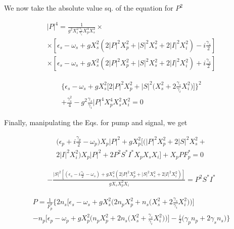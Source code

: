 \documentclass[a4paper,prb,10pt,aps,twocolumn]{revtex4-1}
\begin{document}
We now take the absolute value sq. of the equation for $P^{2}$

\begin{multline}
  \label{eq:28}
|P|^{4}=\frac{1}{g^{2}X_{i}^{2}\frac{\gamma_{s}}{\gamma_{i}}X_{p}^{4}X_{s}^{2}}\times\\
\times \left[\epsilon_{s}-\omega_{s}+gX_{s}^{2}\left(2|P|^{2}X_{p}^{2}+|S|^{2}X_{s}^{2}+2|I|^{2}X_{i}^{2}\right)-i\frac{\gamma_{s}}{2}\right]\\
\times \left[\epsilon_{s}-\omega_{s}+gX_{s}^{2}\left(2|P|^{2}X_{p}^{2}+|S|^{2}X_{s}^{2}+2|I|^{2}X_{i}^{2}\right)+i\frac{\gamma_{s}}{2}\right]
\end{multline}

\begin{multline}
  \label{eq:29}
  \Bigg\{ \epsilon_{s}-\omega_{s}+gX_{s}^{2}\Bigg[2|P|^{2}X_{p}^{2}+|S|^{2}\Bigg(X_{s}^{2}+2\frac{\gamma_{s}}{\gamma_{i}}X_{i}^{2}\Bigg)\Bigg]\Bigg\}^{2}\\
+\frac{\gamma_{s}^{2}}{4}-g^{2}\frac{\gamma_{s}}{\gamma_{i}}|P|^{4}X_{p}^{4}X_{s}^{2}X_{i}^{2}=0
\end{multline}



Finally, manipulating the Eqs. for pump and signal, we get

\begin{multline}
  \label{eq:30}
\Bigg(\epsilon_{p}+i\frac{\gamma_{p}}{2}-\omega_{p}\Bigg)X_{p}|P|^{2}+gX_{p}^{2}\Bigg[\Bigg(|P|^{2}X_{p}^{2}+2|S|^{2}X_{s}^{2}+\\
 2|I|^{2}X_{i}^{2}\Bigg)X_{p}|P|^{2}+2P^{2}S^{*}I^{*}X_{p}X_{s}X_{i}\Bigg]+X_{p}PF_{p}^{*}=0  
\end{multline}

\tiny
\begin{multline}
  \label{eq:31}
-\frac{|S|^{2}\left[\left(\epsilon_{s}-i\frac{\gamma_{s}}{2}-\omega_{s}\right)+gX_{s}^{2}\left(2|P|^{2}X_{p}^{2}+|S|^{2}X_{s}^{2}+2|I|^{2}X_{i}^{2}\right)\right]}{gX_{s}X_{p}^{2}X_{i}}=P^{2}S^{*}I^{*}  
\end{multline}
\normalsize

\begin{multline}
  \label{eq:33}
P=\frac{1}{F_{p}^{*}}\Bigg\{ 2n_{s}\Bigg[\epsilon_{s}-\omega_{s}+gX_{s}^{2}\Bigg(2n_{p}X_{p}^{2}+n_{s}\Bigg(X_{s}^{2}+2\frac{\gamma_{s}}{\gamma_{i}}X_{i}^{2}\Bigg)\Bigg)\Bigg]\\
-n_{p}\Bigg[\epsilon_{p}-\omega_{p}+gX_{p}^{2}\Bigg(n_{p}X_{p}^{2}+2n_{s}\Bigg(X_{s}^{2}+\frac{\gamma_{s}}{\gamma_{i}}X_{i}^{2}\Bigg)\Bigg)\Bigg]-\frac{i}{2}\Bigg(\gamma_{p}n_{p}+2\gamma_{s}n_{s}\Bigg)\Bigg\}  
\end{multline}
\end{document}
